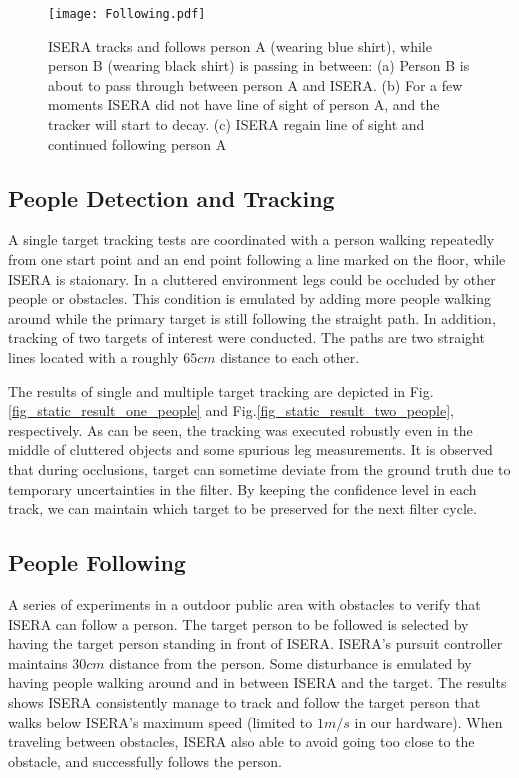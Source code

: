 \documentclass[10 pt,a4paper,conference]{IEEEtran}
\begin{document}
\begin{figure*}[!t]
\centering
\texttt{[image: Following.pdf]}
\caption{ISERA tracks and follows person A (wearing blue shirt), while person B (wearing black shirt) is passing in between: (a) Person B is about to pass through between person A and ISERA. (b) For a few moments ISERA did not have line of sight of person A, and the tracker will start to decay. (c) ISERA regain line of sight and continued following person A} \label{fig:blocked}
\vspace*{4pt}
\end{figure*}

\subsection{People Detection and
Tracking}\label{people-detection-and-tracking}

A single target tracking tests are coordinated with a person walking
repeatedly from one start point and an end point following a line marked
on the floor, while ISERA is staionary. In a cluttered environment legs
could be occluded by other people or obstacles. This condition is
emulated by adding more people walking around while the primary target
is still following the straight path. In addition, tracking of two
targets of interest were conducted. The paths are two straight lines
located with a roughly \(65cm\) distance to each other.

The results of single and multiple target tracking are depicted in
Fig.\ref{fig_static_result_one_people} and
Fig.\ref{fig_static_result_two_people}, respectively. As can be seen,
the tracking was executed robustly even in the middle of cluttered
objects and some spurious leg measurements. It is observed that during
occlusions, target can sometime deviate from the ground truth due to
temporary uncertainties in the filter. By keeping the confidence level
in each track, we can maintain which target to be preserved for the next
filter cycle.

\subsection{People Following}\label{people-following}

A series of experiments in a outdoor public area with obstacles to
verify that ISERA can follow a person. The target person to be followed
is selected by having the target person standing in front of ISERA.
ISERA's pursuit controller maintains \(30cm\) distance from the person.
Some disturbance is emulated by having people walking around and in
between ISERA and the target. The results shows ISERA consistently
manage to track and follow the target person that walks below ISERA's
maximum speed (limited to \(1m/s\) in our hardware). When traveling
between obstacles, ISERA also able to avoid going too close to the
obstacle, and successfully follows the person.
\end{document}
